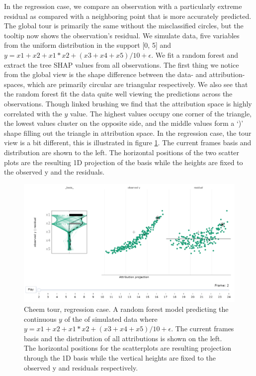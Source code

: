 \documentclass[
]{article}
\begin{document}
In the regression case, we compare an observation with a particularly extreme residual as compared with a neighboring point that is more accurately predicted. The global tour is primarily the same without the misclassified circles, but the tooltip now shows the observation's residual. We simulate data, five variables from the uniform distribution in the support {[}0, 5{]} and \(y = x1 + x2 + x1*x2 + (x3 + x4 + x5) / 10 + \epsilon\). We fit a random forest and extract the tree SHAP values from all observations. The first thing we notice from the global view is the shape difference between the data- and attribution-spaces, which are primarily circular are triangular respectively. We also see that the random forest fit the data quite well viewing the predictions across the observations. Though linked brushing we find that the attribution space is highly correlated with the \(y\) value. The highest values occupy one corner of the triangle, the lowest values cluster on the opposite side, and the middle values form a `)' shape filling out the triangle in attribution space. In the regression case, the tour view is a bit different, this is illustrated in figure \ref{fig:cheemtourreg}. The current frames basis and distribution are shown to the left. The horizontal positions of the two scatter plots are the resulting 1D projection of the basis while the heights are fixed to the observed y and the residuals.



\begin{figure}

{\centering \includegraphics[width=1\linewidth]{./figures/cheem_tour_toy_reg} 

}

\caption{Cheem tour, regression case. A random forest model predicting the continuous \(y\) of the of simulated data where \(y = x1 + x2 + x1*x2 + (x3 + x4 + x5) / 10 + \epsilon\). The current frames basis and the distribution of all attributions is shown on the left. The horizontal positions for the scatterplots are resulting projection through the 1D basis while the vertical heights are fixed to the observed y and residuals respectively.}\label{fig:cheemtourreg}
\end{figure}
\end{document}
